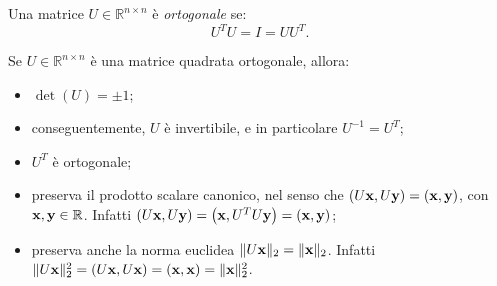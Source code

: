 \begin{definition}
	Una matrice $U\in \mathbb{R}^{n\times n}$ è \textit{ortogonale} se:
	\begin{equation*}
		U^{T} U=I=UU^{T} .
	\end{equation*}
\end{definition}
\begin{theorem}
	Se $U\in \mathbb{R}^{n\times n}$ è una matrice quadrata ortogonale, allora:
\begin{itemize}
	\item $\operatorname{det}( U) =\pm 1$;
	\item conseguentemente, $U$ è invertibile, e in particolare $U^{-1} =U^{T}$;
	\item $U^{T}$ è ortogonale;
	\item preserva il prodotto scalare canonico, nel senso che $( U\mathbf{x} ,U\mathbf{y}) =(\mathbf{x} ,\mathbf{y})$, con $\mathbf{x} ,\mathbf{y} \in \mathbb{R}$.
		Infatti $( U\mathbf{x} ,U\mathbf{y}) =\left(\mathbf{x} ,U^{T} U\mathbf{y}\right) =(\mathbf{x} ,\mathbf{y})$;
	\item preserva anche la norma euclidea $\Vert U\mathbf{x}\Vert _{2} =\Vert \mathbf{x}\Vert _{2}$.
		Infatti $\Vert U\mathbf{x}\Vert ^{2}_{2} =( U\mathbf{x} ,U\mathbf{x}) =(\mathbf{x} ,\mathbf{x}) =\Vert \mathbf{x}\Vert _{2}^{2} $.
\end{itemize}
\end{theorem}
